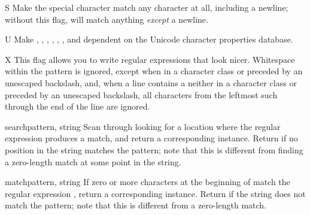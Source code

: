 \begin{datadesc}{S}
Make the  special character match any character at all,
including a newline; without this flag,  will match
anything \emph{except} a newline.
\end{datadesc}

\begin{datadesc}{U}
Make , , , ,
, ,  and 
dependent on the Unicode character properties database.
\end{datadesc}

\begin{datadesc}{X}
This flag allows you to write regular expressions that look nicer.
Whitespace within the pattern is ignored,
except when in a character class or preceded by an unescaped
backslash, and, when a line contains a \character{\#} neither in a
character class or preceded by an unescaped backslash, all characters
from the leftmost such \character{\#} through the end of the line are
ignored.
\end{datadesc}


\begin{funcdesc}{search}{pattern, string}
  Scan through  looking for a location where the regular
  expression  produces a match, and return a
  corresponding  instance.
  Return  if no
  position in the string matches the pattern; note that this is
  different from finding a zero-length match at some point in the string.
\end{funcdesc}

\begin{funcdesc}{match}{pattern, string}
  If zero or more characters at the beginning of  match
  the regular expression , return a corresponding
   instance.  Return  if the string does not
  match the pattern; note that this is different from a zero-length
  match.

\end{funcdesc}

